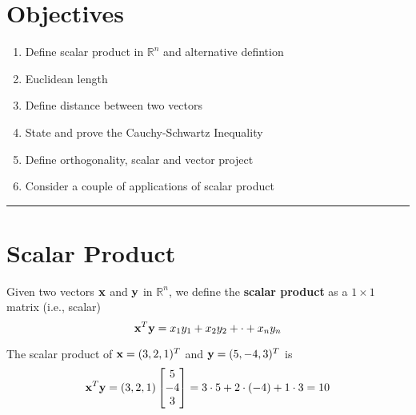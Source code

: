 %


\section*{Objectives}
\begin{enumerate}
	\item Define scalar product in $\mathbb{R}^n$ and alternative defintion
	\item Euclidean length 
	\item Define distance between two vectors
    	\item State and prove the Cauchy-Schwartz Inequality
	\item Define orthogonality, scalar and vector project
	\item Consider a couple of applications of scalar product
\end{enumerate}






\rule[0.01in]{\textwidth}{0.0025in}


\section{Scalar Product}

\begin{definition}
	Given two vectors ${\bf x}$ and ${\bf y}$ in $\mathbb{R}^n$, we define the \textbf{scalar product} as a $1 \times 1$ matrix (i.e., scalar)
	\[  {\bf x}^T {\bf y} = x_1 y_1 + x_2 y_2 + \cdot + x_n y_n \] 
\end{definition}
 
 
 \begin{example}
 	The scalar product of ${\bf x} = (3, 2, 1)^T$ and ${\bf y} = (5, -4, 3)^T$ is
		\[ {\bf x}^T {\bf y} = (3, 2, 1) \begin{bmatrix} 5 \\ -4 \\3 \end{bmatrix} = 3 \cdot 5 + 2 \cdot (-4) + 1 \cdot 3 = 10 \]
 \end{example}

